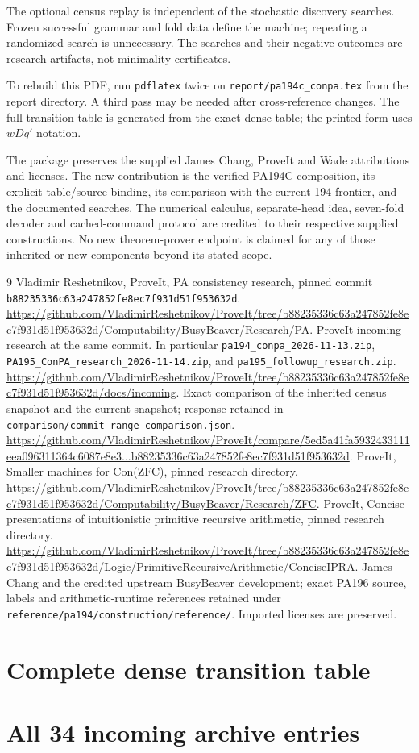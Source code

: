 \documentclass[11pt,letterpaper]{article}
\newcommand{\file}[1]{\texttt{\nolinkurl{#1}}}
\begin{document}
The optional census replay is independent of the stochastic discovery searches.
Frozen successful grammar and fold data define the machine; repeating a
randomized search is unnecessary. The searches and their negative outcomes
are research artifacts, not minimality certificates.

To rebuild this PDF, run \file{pdflatex} twice on
\file{report/pa194c_conpa.tex} from the report directory. A third pass may be
needed after cross-reference changes. The full transition table is generated
from the exact dense table; the printed form uses $wDq'$ notation.

The package preserves the supplied James Chang, ProveIt and Wade attributions
and licenses. The new contribution is the verified PA194C composition, its
explicit table/source binding, its comparison with the current 194 frontier,
and the documented searches. The numerical calculus, separate-head idea,
seven-fold decoder and cached-command protocol are credited to their respective
supplied constructions. No new theorem-prover endpoint is claimed for any
of those inherited or new components beyond its stated scope.

\begin{thebibliography}{9}
 Vladimir Reshetnikov, ProveIt, PA consistency research, pinned
commit \file{b88235336c63a247852fe8ec7f931d51f953632d}.
\url{https://github.com/VladimirReshetnikov/ProveIt/tree/b88235336c63a247852fe8ec7f931d51f953632d/Computability/BusyBeaver/Research/PA}.
 ProveIt incoming research at the same commit. In particular
\file{pa194_conpa_2026-11-13.zip},
\file{PA195_ConPA_research_2026-11-14.zip}, and
\file{pa195_followup_research.zip}.
\url{https://github.com/VladimirReshetnikov/ProveIt/tree/b88235336c63a247852fe8ec7f931d51f953632d/docs/incoming}.
 Exact comparison of the inherited census snapshot and the
current snapshot; response retained in \file{comparison/commit_range_comparison.json}.
\url{https://github.com/VladimirReshetnikov/ProveIt/compare/5ed5a41fa5932433111eea096311364c6087e8e3...b88235336c63a247852fe8ec7f931d51f953632d}.
 ProveIt, Smaller machines for Con(ZFC), pinned research directory.
\url{https://github.com/VladimirReshetnikov/ProveIt/tree/b88235336c63a247852fe8ec7f931d51f953632d/Computability/BusyBeaver/Research/ZFC}.
 ProveIt, Concise presentations of intuitionistic primitive
recursive arithmetic, pinned research directory.
\url{https://github.com/VladimirReshetnikov/ProveIt/tree/b88235336c63a247852fe8ec7f931d51f953632d/Logic/PrimitiveRecursiveArithmetic/ConciseIPRA}.
 James Chang and the credited upstream BusyBeaver development;
exact PA196 source, labels and arithmetic-runtime references retained under
\file{reference/pa194/construction/reference/}. Imported licenses are preserved.
\end{thebibliography}

\appendix
\clearpage
\section{Complete dense transition table}\label{app:table}

\clearpage
\section{All 34 incoming archive entries}

\end{document}

